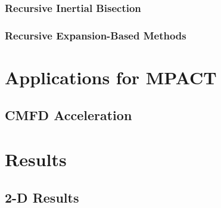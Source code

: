 {{{      \subsubsection{Recursive Inertial Bisection}{\label{sssec:Spatial Decomposition:Recursive Inertial Bisection}
        \blindtext[4]
      }
      \subsubsection{Recursive Expansion-Based Methods}{\label{sssec:Spatial Decomposition:Recursive Expansion-Based Methods}
        \blindtext[8]
      }
    }
  }
  \section{Applications for MPACT}{\label{sec:Spatial Decomposition:Applications for MPACT}
    \blindtext[8]
    \subsection{CMFD Acceleration}{\label{ssec:Spatial Decomposition:CMFD Acceleration}
      \blindtext[3]
    }
  }
  \section{Results}{\label{sec:Spatial Decomposition:Results}
    \subsection{2-D Results}{\label{ssec:Spatial Decomposition:2-D Results}
      \blindtext[8]
    }
}}
